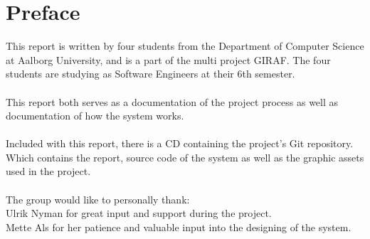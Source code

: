\chapter*{Preface}
\label{chap:preface}
This report is written by four students from the Department of Computer Science at Aalborg University, and is a part of the multi project GIRAF. The four students are studying as Software Engineers at their 6th semester.\\
\\
This report both serves as a documentation of the project process as well as documentation of how the system works.\\
\\
Included with this report, there is a CD containing the project's Git repository. Which contains the report, source code of the system as well as the graphic assets used in the project.\\
\\
The group would like to personally thank:\\
Ulrik Nyman for great input and support during the project.\\
Mette Als for her patience and valuable input into the designing of the system.\\
